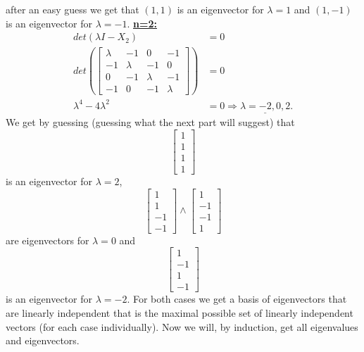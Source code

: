 \documentclass{article}
\begin{document}
after an easy guess we get that $(1,1)$ is an eigenvector for $\lambda=1$ and $(1,-1)$ is an eigenvector for $\lambda=-1$.
\newline\newline
\underline{\textbf{n=2:}}
\begin{align*} 
det(\lambda I -X_2)&=0 \\ det\left(\begin{bmatrix} \lambda & -1 & 0 & -1 \\ -1 & \lambda & -1 & 0 \\ 0 & -1 & \lambda & -1 \\ -1 & 0 & -1 & \lambda \end{bmatrix}\right)&=0 \\ \lambda^4-4\lambda^2&=0 \Longrightarrow \underline{\lambda=-2,0,2}.
\end{align*}
We get by guessing (guessing what the next part will suggest) that \[\begin{bmatrix} 1 \\ 1 \\ 1 \\ 1 \end{bmatrix}\] is an eigenvector for $\lambda = 2$, \[\begin{bmatrix} 1 \\ 1 \\ -1 \\ -1 \end{bmatrix} \land \begin{bmatrix} 1 \\ -1  \\ -1 \\ 1\end{bmatrix}\] are eigenvectors for $\lambda=0$ and \[\begin{bmatrix} 1 \\ -1 \\ 1 \\ -1 \end{bmatrix}\]  is an eigenvector for $\lambda=-2$. For both cases we get a basis of eigenvectors that are linearly independent that is the maximal possible set of linearly independent vectors (for each case individually).  
Now we will, by induction, get all eigenvalues and eigenvectors. 
\end{document}
